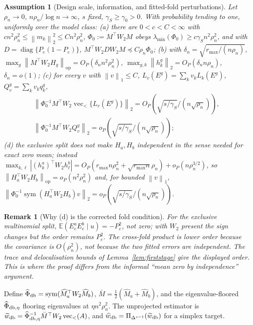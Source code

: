 \documentclass[12pt]{article}
\newtheorem{remark}{Remark}
\newtheorem{assumption}{Assumption}
\newcommand{\E}{\mathbb{E}}
\newcommand{\1}{\mathbf{1}}
\newcommand{\norm}[1]{\left\lVert#1\right\rVert}
\DeclareMathOperator{\diag}{diag}
\providecommand{\op}{\operatorname{op}}
\providecommand{\sym}{\operatorname{sym}}
\begin{document}
\begin{assumption}[Design scale, information, and fitted-fold perturbations]
\label{ass:T1}
Let $\rho_n\to0$, $n\rho_n/\log n\to\infty$, $s$ fixed, $\gamma_S\ge\gamma_0>0$. With probability
tending to one, uniformly over the model class:
\emph{(a)} there are $0<c<C<\infty$ with $cn^2\rho_n^2\le\norm{m_k}_2^2\le Cn^2\rho_n^2$,
$\Phi_0:=M^\top W_2M$ obeys $\lambda_{\min}(\Phi_0)\ge c\gamma_S n^2\rho_n^2$, and with
$D=\diag\{P_e(1-P_e)\}$, $M^\top W_2DW_2M\preceq C\rho_n\Phi_0$;
\emph{(b)} with $\delta_n=\sqrt{r_{\max}/(n\rho_n)}$, $\max_g\norm{M^\top
W_2H_g}_{\op}=O_P(\delta_n n^2\rho_n^2)$, $\max_{g,k}\norm{h_k^g}_2=O_P(\delta_n n\rho_n)$,
$\delta_n=o(1)$;
\emph{(c)} for every $v$ with $\norm{v}_1\le C$, $L_v(E^g)=\sum_kv_kL_k(E^g)$, $Q_v^g=\sum_kv_kq_k^g$,
\begin{gather*}
        \norm{\Phi_0^{-1}M^\top W_2\operatorname{vec}_<\{L_v(E^g)\}}_2=O_P(\sqrt{s/\gamma_S}/(n\sqrt{\rho_n})),\\[2pt]
        \norm{\Phi_0^{-1}M^\top W_2Q_v^g}_2=o_P(\sqrt{s/\gamma_S}/(n\sqrt{\rho_n}));
\end{gather*}
\emph{(d)} the exclusive split does not make $H_a,H_b$ independent in the sense needed for exact
zero mean; instead $\max_{k,\ell}|(h_k^a)^\top W_2h_\ell^b|=O_P(r_{\max}n\rho_n^2+\sqrt{r_{\max}n}\rho_n)+o_P(n\rho_n^{3/2})$,
so $\norm{H_a^\top W_2H_b}_{\op}=o_P(n^2\rho_n^2)$ and, for bounded $\norm{v}_1$, $\norm{\Phi_0^{-1}\sym(H_a^\top
W_2H_b)v}_2=o_P(\sqrt{s/\gamma_S}/(n\sqrt{\rho_n}))$.
\end{assumption}

\begin{remark}[Why \textup{(d)} is the corrected fold condition]
\label{rem:fold-covariance}
For the exclusive multinomial split, $\E(E_e^aE_e^b\mid u)=-P_e^2$, not zero; with $W_2$ present
the sign changes but the order remains $P_e^2$. The cross-fold product is lower order because the
covariance is $O(\rho_n^2)$, not because the two fitted errors are independent. The trace and
delocalisation bounds of Lemma~\ref{lem:firststage} give the displayed order. This is where the
proof differs from the informal ``mean zero by independence'' argument.
\end{remark}

Define $\widehat\Phi_{\rm db}=\sym(\widehat M_a^\top W_2\widehat M_b)$, $\bar M=\tfrac12(\widehat
M_a+\widehat M_b)$, and the eigenvalue-floored $\widehat\Phi_{{\rm db},\eta}$ flooring eigenvalues
at $\eta n^2\rho_n^2$. The unprojected estimator is $\widetilde w_{\rm db}=\widehat\Phi_{{\rm
db},\eta}^{-1}\bar M^\top W_2\operatorname{vec}_<(A)$, and $\widehat w_{\rm
db}=\Pi_{\Delta^{s-1}}(\widetilde w_{\rm db})$ for a simplex target.
\end{document}
